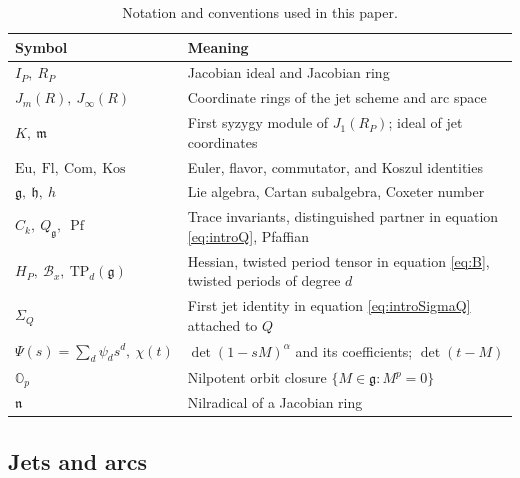 \documentclass[10pt,reqno]{amsart}
\numberwithin{equation}{section}
\theoremstyle{plain}
\theoremstyle{definition}
\DeclareMathOperator{\Pf}{Pf}
\newcommand{\Eu}{\mathrm{Eu}}
\newcommand{\Kos}{\mathrm{Kos}}
\newcommand{\Fl}{\mathrm{Fl}}
\newcommand{\TP}{\mathrm{TP}}
\begin{document}
\begin{table}[ht]
\centering
\renewcommand{\arraystretch}{1.12}
\begin{tabular}{@{\phantom{S}}p{}p{}@{}}
	\toprule
	Symbol & Meaning\\\midrule
	$I_P,\ R_P$ & Jacobian ideal and Jacobian ring\\
	$J_m(R),\ J_\infty(R)$ & Coordinate rings of the jet scheme and arc space\\
	$K,\ \mathfrak{m}$ & First syzygy module of $J_1(R_P)$; ideal of jet coordinates\\
	$\Eu,\ \Fl,\ \mathrm{Com},\ \Kos$ & Euler, flavor, commutator, and Koszul identities\\
	$\mathfrak{g},\ \mathfrak{h},\ h$ & Lie algebra, Cartan subalgebra, Coxeter number\\
	$C_k,\ Q_\mathfrak{g},\ \Pf$ & Trace invariants, distinguished partner in equation \eqref{eq:introQ}, Pfaffian\\
	$H_P,\ \mathcal{B}_x,\ \TP_d(\mathfrak{g})$ & Hessian, twisted period tensor in equation \eqref{eq:B}, twisted periods of degree $d$\\
	$\Sigma_Q$ & First jet identity in equation \eqref{eq:introSigmaQ} attached to $Q$\\
	$\Psi(s)=\sum_d\psi_ds^d,\ \chi(t)$ & $\det(1-sM)^\alpha$ and its coefficients; $\det(t-M)$\\
	$\mathbb O_p$ & Nilpotent orbit closure $\{M\in\mathfrak{g}:M^p=0\}$\\
	$\mathfrak{n}$ & Nilradical of a Jacobian ring\\\bottomrule
\end{tabular}
\caption{Notation and conventions used in this paper.}
\label{tab:notation}
\end{table}

\subsection{Jets and arcs}
\end{document}
